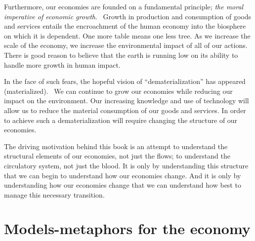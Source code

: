 Furthermore,
our economies are founded on a fundamental principle;
\emph{the moral imperative of economic growth}.~\cite{Daly1995}
Growth in production and consumption of goods and services
entails the encroachment of the human economy into the
biosphere on which it is dependent.
One more table means one less tree.
As we increase the scale of the economy,
we increase the environmental impact of all of our actions.
There is good reason to believe that the earth 
is running low on its ability to handle more growth in
human impact.\cite{UNMEA2005}

In the face of such fears,
the hopeful vision of ``dematerialization'' 
has appeared (materialized).~\cite{Bernardini1993, Wernick1996, Cleveland1998}
We can continue to grow our economies
while reducing our impact on the environment.
Our increasing knowledge and use of technology will
allow us to reduce the material consumption of 
our goods and services.
In order to achieve such a dematerialization 
will require changing the structure of our economies.

The driving motivation behind this book is 
an attempt to understand
the structural elements of our economies,
not just the flows;
to understand the circulatory system,
not just the blood.
It is only by understanding this structure that we can 
begin to understand how our economies change.
And it is only by understanding how our economies change
that we can understand how best to manage this necessary
transition.

\section{Models-metaphors for the economy}
\label{sec:metaphors}




